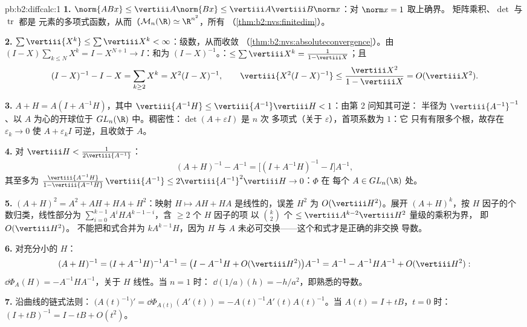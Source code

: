 \begin{solution}{pb:b2:diffcalc:1}
\textbf{1.} $\norm{ABx} \leq \vertiii A\norm{Bx} \leq
\vertiii A\vertiii B\norm x$：对 $\norm x = 1$ 取上确界。
矩阵乘积、$\det$ 与 $\operatorname{tr}$ 都是
元素的多项式函数，从而（$\mathcal M_n(\R)
\simeq \R^{n^2}$，所有
（\cref{thm:b2:nvs:finitedim}）。

\textbf{2.} $\sum\vertiii{X^k} \leq \sum\vertiii X^k <
\infty$：级数，从而收敛
（\cref{thm:b2:nvs:absoluteconvergence}）。由 $(I -
X)\sum_{k\leq N}X^k = I - X^{N+1} \to I$：和为 $(I -
X)^{-1}$。：$\leq \sum\vertiii X^k = \frac{1}{1 -
\vertiii X}$；且
\[
(I - X)^{-1} - I - X = \sum_{k\geq2}X^k = X^2(I - X)^{-1},
\qquad
\vertiii{X^2(I-X)^{-1}} \leq
\frac{\vertiii X^2}{1 - \vertiii X} = O(\vertiii X^2).
\]

\textbf{3.} $A + H = A(I + A^{-1}H)$，其中 $\vertiii{A^{-1}H}
\leq \vertiii{A^{-1}}\vertiii H < 1$：由第 2 问知其可逆：
半径为 $\vertiii{A^{-1}}^{-1}$、以 $A$ 为心的开球位于
$GL_n(\R)$ 中。稠密性：$\det(A + \varepsilon I)$ 是 $n$ 次
多项式（关于 $\varepsilon$），首项系数为 $1$：它
只有有限多个根，故存在 $\varepsilon_k \to 0$
使 $A + \varepsilon_kI$ 可逆，且收敛于 $A$。

\textbf{4.} 对 $\vertiii H < \frac{1}{2\vertiii{A^{-1}}}$：
\[
(A + H)^{-1} - A^{-1}
= \bigl[(I + A^{-1}H)^{-1} - I\bigr]A^{-1},
\]
其至多为 $\frac{\vertiii{A^{-1}H}}{1 -
\vertiii{A^{-1}H}}\,\vertiii{A^{-1}} \leq
2\vertiii{A^{-1}}^2\vertiii H \to 0$：$\Phi$ 在
每个 $A \in GL_n(\R)$ 处。

\textbf{5.} $(A+H)^2 = A^2 + AH + HA + H^2$：映射 $H
\mapsto AH + HA$ 是线性的，误差 $H^2$ 为
$O(\vertiii H^2)$。展开 $(A + H)^k$，按 $H$ 因子的个数归类，线性部分为
$\sum_{i=0}^{k-1}A^iHA^{k-1-i}$，含 $\geq 2$ 个 $H$ 因子的项
以 $\binom k2$ 个
 $\leq \vertiii A^{k-2}\vertiii H^2$ 量级的乘积为界，
即 $O(\vertiii H^2)$。
不能把和式合并为 $kA^{k-1}H$，因为 $H$ 与 $A$
未必可交换——这个和式才是正确的非交换
导数。

\textbf{6.} 对充分小的 $H$：
\[
(A+H)^{-1} = (I + A^{-1}H)^{-1}A^{-1}
= \bigl(I - A^{-1}H + O(\vertiii H^2)\bigr)A^{-1}
= A^{-1} - A^{-1}HA^{-1} + O(\vertiii H^2) :
\]
$\dd\Phi_A(H) = -A^{-1}HA^{-1}$，关于 $H$ 线性。当 $n = 1$ 时：
$\dd(1/a)(h) = -h/a^2$，即熟悉的导数。

\textbf{7.} 沿曲线的链式法则：
$\bigl(A(t)^{-1}\bigr)' = \dd\Phi_{A(t)}(A'(t)) =
-A(t)^{-1}A'(t)A(t)^{-1}$。当 $A(t) = I + tB$，$t = 0$ 时：$(I +
tB)^{-1} = I - tB + O(t^2)$。


\end{solution}
